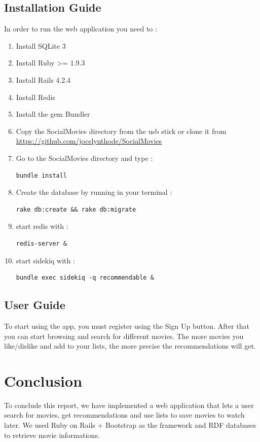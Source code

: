 \documentclass[12pt,a4paper]{article}
\begin{document}
\subsection{Installation Guide}
In order to run the web application you need to :
\begin{enumerate}
\item Install SQLite 3
\item Install Ruby >= 1.9.3
\item Install Rails 4.2.4
\item Install Redis
\item Install the gem Bundler
\item Copy the SocialMovies directory from the usb stick or clone it from \href{https://github.com/jocelynthode/SocialMovies}{https://github.com/jocelynthode/SocialMovies}
\item Go to the SocialMovies directory and type : \begin{lstlisting} 
bundle install 
\end{lstlisting}
\item Create the database by running in your terminal :
\begin{lstlisting} 
rake db:create && rake db:migrate
\end{lstlisting}
\item start redis with :
\begin{lstlisting} 
redis-server &
\end{lstlisting}
\item start sidekiq with :
\begin{lstlisting} 
bundle exec sidekiq -q recommendable &
\end{lstlisting}
\end{enumerate}
\subsection{User Guide}
To start using the app, you must register using the Sign Up button. After that you can start browsing and search for different movies. The more movies you like/dislike and add to your lists, the more precise the recommendations will get.


\section{Conclusion}
To conclude this report, we have implemented a web application that lets a user search for movies, get recommendations and use lists to save movies to watch later. We used Ruby on Rails + Bootstrap as the framework and RDF databases to retrieve movie informations.
\end{document}
